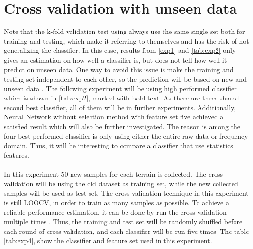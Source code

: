 \documentclass[USenglish]{ifimaster}  %
\begin{document}
\section{Cross validation with unseen data} \label{seq:crossunseen}
Note that the k-fold validation test using always use the same single set both for training and testing, which make it referring to themselves and has the risk of not generalizing the classifier. In this case, results from \ref{exp1} and \ref{tab:exp2} only gives an estimation on how well a classifier is, but does not tell how well it predict on unseen data. One way to avoid this issue is make the training and testing set independent to each other, so the prediction will be based on new and unseen data \cite{26b23e912c654fe4b7478fd910130195}. The following experiment will be using high performed classifier which is shown in \ref{tab:exp2}, marked with bold text. As there are three shared second best classifier, all of them will be in further experiments. Additionally, Neural Network without selection method with feature set five achieved a satisfied result which will also be further investigated. The reason is among the four best performed classifier is only using either the entire raw data or frequency domain. Thus, it will be interesting to compare a classifier that use statistics features.
\\
\\
In this experiment 50 new samples for each terrain is collected. The cross validation will be using the old dataset as training set, while the new collected samples will be used as test set. The cross validation technique in this experiment is still LOOCV, in order to train as many samples as possible. To achieve a reliable performance estimation, it can be done by run the cross-validation multiple times \cite{Refaeilzadeh2009}. Thus, the training and test set will be randomly shuffled before each round of cross-validation, and each classifier will be run five times. The table \ref{tab:exp4}, show the classifier and feature set used in this experiment.
\end{document}
